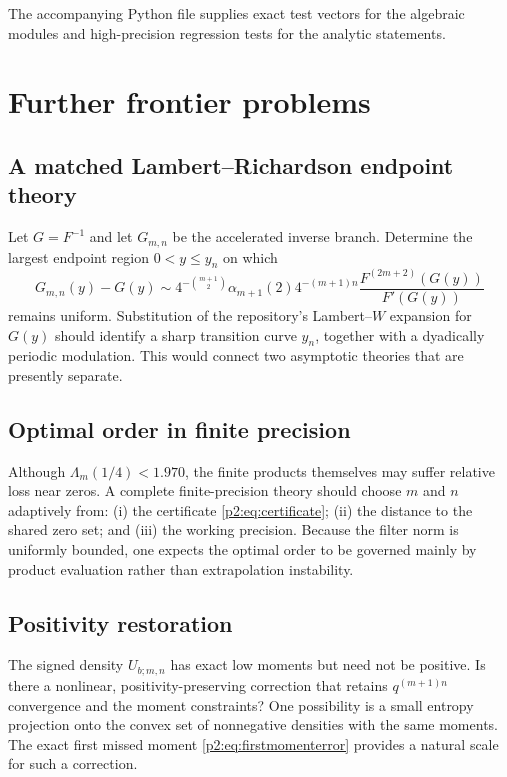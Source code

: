\documentclass[11pt,oneside]{article}
\numberwithin{equation}{section}
\theoremstyle{definition}
\theoremstyle{remark}
\begin{document}
The accompanying Python file supplies exact test vectors for the algebraic
modules and high-precision regression tests for the analytic statements.

\section{Further frontier problems}
\label{p2:sec:open}

\subsection{A matched Lambert--Richardson endpoint theory}

Let \(G=F^{-1}\) and let \(G_{m,n}\) be the accelerated inverse branch. Determine
the largest endpoint region \(0<y\leq y_n\) on which
\[
 G_{m,n}(y)-G(y)
 \sim 4^{-\binom{m+1}{2}}\alpha_{m+1}(2)4^{-(m+1)n}
 \frac{F^{(2m+2)}(G(y))}{F'(G(y))}
\]
remains uniform. Substitution of the repository's Lambert--\(W\) expansion for
\(G(y)\) should identify a sharp transition curve \(y_n\), together with a
dyadically periodic modulation. This would connect two asymptotic theories that
are presently separate.

\subsection{Optimal order in finite precision}

Although \(\Lambda_m(1/4)<1.970\), the finite products themselves may suffer
relative loss near zeros. A complete finite-precision theory should choose
\(m\) and \(n\) adaptively from: (i) the certificate \eqref{p2:eq:certificate};
(ii) the distance to the shared zero set; and (iii) the working precision.
Because the filter norm is uniformly bounded, one expects the optimal order to be
governed mainly by product evaluation rather than extrapolation instability.

\subsection{Positivity restoration}

The signed density \(U_{b;m,n}\) has exact low moments but need not be positive.
Is there a nonlinear, positivity-preserving correction that retains
\(q^{(m+1)n}\) convergence and the moment constraints? One possibility is a
small entropy projection onto the convex set of nonnegative densities with the
same moments. The exact first missed moment \eqref{p2:eq:firstmomenterror} provides
a natural scale for such a correction.
\end{document}
